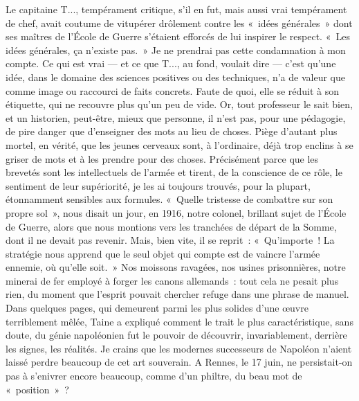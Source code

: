 \documentclass[french,twoside]{book} %
\begin{document}
Le capitaine T..., tempérament critique, s’il en fut, mais aussi vrai tempérament de chef, avait coutume de vitupérer drôlement contre les « idées générales »   dont ses maîtres de l’École de Guerre s’étaient efforcés de lui inspirer le respect. « Les idées générales, ça n’existe pas. » Je ne prendrai pas cette condamnation à mon compte. Ce qui est vrai — et ce que T..., au fond, voulait dire — c’est qu’une idée, dans le domaine des sciences positives ou des techniques, n’a de valeur que comme image ou raccourci de faits concrets. Faute de quoi, elle se réduit à son étiquette, qui ne recouvre plus qu’un peu de vide. Or, tout professeur le sait bien, et un historien, peut-être, mieux que personne, il n’est pas, pour une pédagogie, de pire danger que d’enseigner des mots au lieu de choses. Piège d’autant plus mortel, en vérité, que les jeunes cerveaux sont, à l’ordinaire, déjà trop enclins à se griser de mots et à les prendre pour des choses. Précisément parce que les brevetés sont les intellectuels de l’armée et tirent, de la conscience de ce rôle, le sentiment de leur supériorité, je les ai toujours trouvés, pour la plupart, étonnamment sensibles aux formules. « Quelle tristesse de combattre sur son propre sol », nous disait un jour, en 1916, notre colonel, brillant sujet de l’École de Guerre, alors que nous montions vers les tranchées de départ de la Somme, dont il ne devait pas revenir. Mais, bien vite, il se reprit : « Qu’importe ! La stratégie nous apprend que le seul objet qui compte est de vaincre l’armée ennemie, où qu’elle soit. » Nos moissons ravagées, nos usines prisonnières, notre minerai de fer employé à forger les canons allemands : tout cela ne pesait plus rien, du moment que l’esprit pouvait chercher refuge dans une phrase de manuel. Dans quelques pages, qui demeurent parmi les plus solides d’une œuvre terriblement mêlée, Taine a expliqué comment le trait le plus caractéristique, sans doute, du génie napoléonien fut le pouvoir de découvrir, invariablement, derrière les signes, les réalités. Je crains que les modernes successeurs de Napoléon n’aient laissé perdre beaucoup de cet art souverain. A Rennes, le 17 juin, ne persistait-on pas   à s’enivrer encore beaucoup, comme d’un philtre, du beau mot de « position » ?\par
\end{document}
